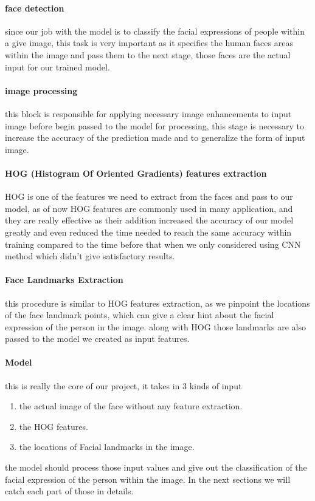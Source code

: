 \paragraph{face detection}
since our job with the model is to classify the facial expressions of people within a give image, this task is very important as it specifies the human faces areas within the image and pass them to the next stage, those faces are the actual input for our trained model.

\paragraph{image processing}
this block is responsible for applying necessary image enhancements to input image before begin passed to the model for processing, this stage is necessary to increase the accuracy of the prediction made and to generalize the form of input image.

\paragraph{HOG (Histogram Of Oriented Gradients) features extraction}
HOG is one of the features we need to extract from the faces and pass to our model, as of now HOG features are commonly used in many application, and they are really effective as their addition increased the accuracy of our model greatly and even reduced the time needed to reach the same accuracy within training compared to the time before that when we only considered using CNN method which didn't give satisfactory results.

\paragraph{Face Landmarks Extraction}
this procedure is similar to HOG features extraction, as we pinpoint the locations of the face landmark points, which can give a clear hint about the facial expression of the person in the image.\newline
along with HOG those landmarks are also passed to the model we created as input features.

\paragraph{Model}
this is really the core of our project, it takes in 3 kinds of input
\begin{enumerate}
	\item the actual image of the face without any feature extraction.
	\item the HOG features.
	\item the locations of Facial landmarks in the image.
\end{enumerate}
the model should process those input values and give out the classification of the facial expression of the person within the image. 
\newline
In the next sections we will catch each part of those in details.

